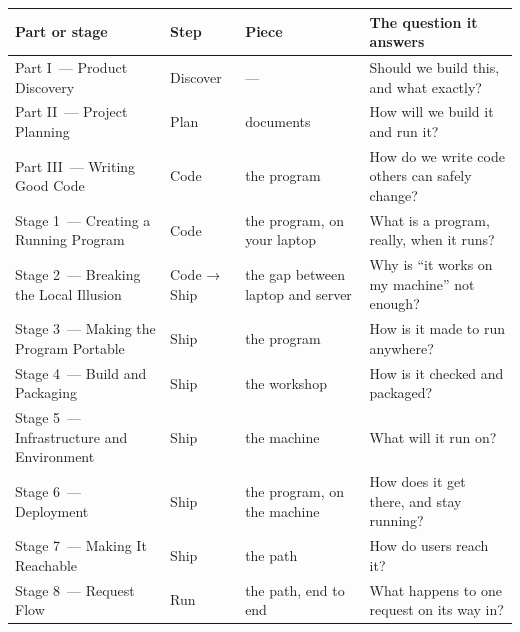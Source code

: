 {\def\LTcaptype{none} %
\begin{longtable}[]{@{}
  >{\raggedright\arraybackslash}p{}
  >{\raggedright\arraybackslash}p{}
  >{\raggedright\arraybackslash}p{}
  >{\raggedright\arraybackslash}p{}@{}}
\toprule\noalign{}
\begin{minipage}[b]{\linewidth}\raggedright
Part or stage
\end{minipage} & \begin{minipage}[b]{\linewidth}\raggedright
Step
\end{minipage} & \begin{minipage}[b]{\linewidth}\raggedright
Piece
\end{minipage} & \begin{minipage}[b]{\linewidth}\raggedright
The question it answers
\end{minipage} \\
\midrule\noalign{}
\endhead
\bottomrule\noalign{}
\endlastfoot
Part I~--- Product Discovery & Discover & --- & Should we build this, and what exactly? \\
Part II~--- Project Planning & Plan & documents & How will we build it and run it? \\
Part III~--- Writing Good Code & Code & the program & How do we write code others can safely change? \\
Stage 1~--- Creating a Running Program & Code & the program, on your laptop & What is a program, really, when it runs? \\
Stage 2~--- Breaking the Local Illusion & Code → Ship & the gap between laptop and server & Why is ``it works on my machine'' not enough? \\
Stage 3~--- Making the Program Portable & Ship & the program & How is it made to run anywhere? \\
Stage 4~--- Build and Packaging & Ship & the workshop & How is it checked and packaged? \\
Stage 5~--- Infrastructure and Environment & Ship & the machine & What will it run on? \\
Stage 6~--- Deployment & Ship & the program, on the machine & How does it get there, and stay running? \\
Stage 7~--- Making It Reachable & Ship & the path & How do users reach it? \\
Stage 8~--- Request Flow & Run & the path, end to end & What happens to one request on its way in? \\

\end{longtable}}
